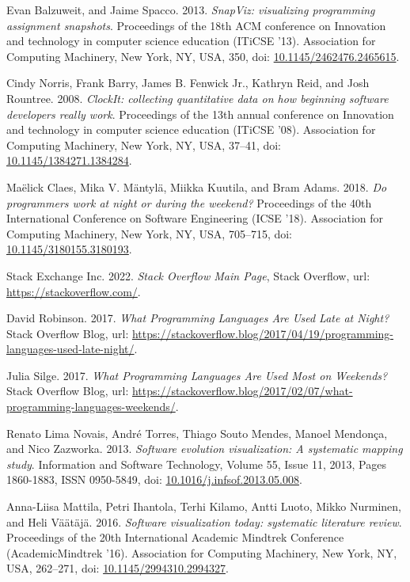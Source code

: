 \begin{thebibliography}{99}
 Evan Balzuweit, and Jaime Spacco. 2013. \textit{SnapViz: visualizing programming assignment snapshots}. Proceedings of the 18th ACM conference on Innovation and technology in computer science education (ITiCSE '13). Association for Computing Machinery, New York, NY, USA, 350, doi: \href{https://doi.org/10.1145/2462476.2465615}{10.1145/2462476.2465615}.

 Cindy Norris, Frank Barry, James B. Fenwick Jr., Kathryn Reid, and Josh Rountree. 2008. \textit{ClockIt: collecting quantitative data on how beginning software developers really work}. Proceedings of the 13th annual conference on Innovation and technology in computer science education (ITiCSE '08). Association for Computing Machinery, New York, NY, USA, 37–41, doi: \href{https://doi.org/10.1145/1384271.1384284}{10.1145/1384271.1384284}.

 Maëlick Claes, Mika V. Mäntylä, Miikka Kuutila, and Bram Adams. 2018. \textit{Do programmers work at night or during the weekend?} Proceedings of the 40th International Conference on Software Engineering (ICSE '18). Association for Computing Machinery, New York, NY, USA, 705–715, doi: \href{https://doi.org/10.1145/3180155.3180193}{10.1145/3180155.3180193}.

 Stack Exchange Inc. 2022. \textit{Stack Overflow Main Page}, Stack Overflow, url: \url{https://stackoverflow.com/}.

 David Robinson. 2017. \textit{What Programming Languages Are Used Late at Night?} Stack Overflow Blog, url: \url{https://stackoverflow.blog/2017/04/19/programming-languages-used-late-night/}.

 Julia Silge. 2017. \textit{What Programming Languages Are Used Most on Weekends?} Stack Overflow Blog, url: \url{https://stackoverflow.blog/2017/02/07/what-programming-languages-weekends/}.

 Renato Lima Novais, André Torres, Thiago Souto Mendes, Manoel Mendonça, and Nico Zazworka. 2013. \textit{Software evolution visualization: A systematic mapping study}. Information and Software Technology, Volume 55, Issue 11, 2013, Pages 1860-1883, ISSN 0950-5849, doi: \href{https://doi.org/10.1016/j.infsof.2013.05.008}{10.1016/j.infsof.2013.05.008}.

 Anna-Liisa Mattila, Petri Ihantola, Terhi Kilamo, Antti Luoto, Mikko Nurminen, and Heli Väätäjä. 2016. \textit{Software visualization today: systematic literature review}. Proceedings of the 20th International Academic Mindtrek Conference (AcademicMindtrek '16). Association for Computing Machinery, New York, NY, USA, 262–271, doi: \href{https://doi.org/10.1145/2994310.2994327}{10.1145/2994310.2994327}.


\end{thebibliography}
